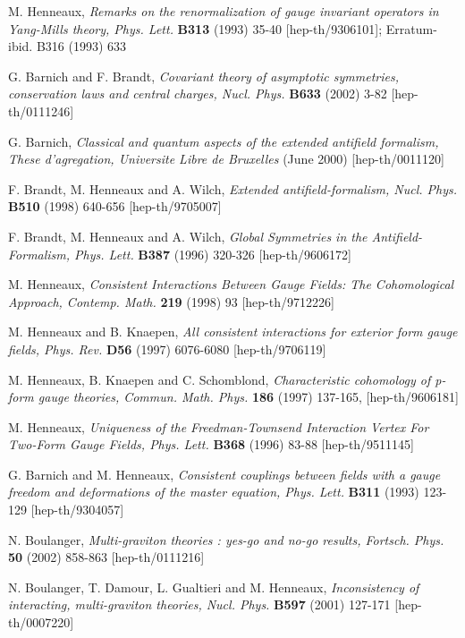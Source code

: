 \documentclass[a4paper,12pt]{article}
\begin{document}
\begin{thebibliography}{99}
  M. Henneaux, \textit{Remarks on the renormalization of
gauge invariant operators in Yang-Mills theory, Phys. Lett.} \textbf{B313}
(1993) 35-40 [hep-th/9306101]; Erratum-ibid. B316 (1993) 633

  G. Barnich and F. Brandt, \textit{Covariant theory of
asymptotic symmetries, conservation laws and central charges, Nucl. Phys.} 
\textbf{B633} (2002) 3-82 [hep-th/0111246]

  G. Barnich, \textit{Classical and quantum aspects of the
extended antifield formalism, These d'agregation, Universite Libre de
Bruxelles} (June 2000) [hep-th/0011120]

  F. Brandt, M. Henneaux and A. Wilch, \textit{Extended
antifield-formalism, Nucl. Phys.} \textbf{B510} (1998) 640-656
[hep-th/9705007]

  F. Brandt, M. Henneaux and A. Wilch, \textit{Global
Symmetries in the Antifield-Formalism, Phys. Lett.} \textbf{B387} (1996)
320-326 [hep-th/9606172]

  M. Henneaux, \textit{Consistent Interactions Between Gauge
Fields: The Cohomological Approach, Contemp. Math.} \textbf{219} (1998) 93
[hep-th/9712226]

  M. Henneaux and B. Knaepen, \textit{All consistent
interactions for exterior form gauge fields, Phys. Rev.} \textbf{D56} (1997)
6076-6080 [hep-th/9706119]

  M. Henneaux, B. Knaepen and C. Schomblond, \textit{%
Characteristic cohomology of p-form gauge theories, Commun. Math. Phys.} 
\textbf{186} (1997) 137-165, [hep-th/9606181]

  M. Henneaux, \textit{Uniqueness of the Freedman-Townsend
Interaction Vertex For Two-Form Gauge Fields, Phys. Lett.} \textbf{B368}
(1996) 83-88 [hep-th/9511145]

  G. Barnich and M. Henneaux, \textit{Consistent couplings
between fields with a gauge freedom and deformations of the master equation,
Phys. Lett.} \textbf{B311} (1993) 123-129 [hep-th/9304057]

  N. Boulanger, \textit{Multi-graviton theories : yes-go and
no-go results, Fortsch. Phys.} \textbf{50} (2002) 858-863 [hep-th/0111216]

  N. Boulanger, T. Damour, L. Gualtieri and M. Henneaux, 
\textit{Inconsistency of interacting, multi-graviton theories, Nucl. Phys.} 
\textbf{B597} (2001) 127-171 [hep-th/0007220]


\end{thebibliography}
\end{document}
